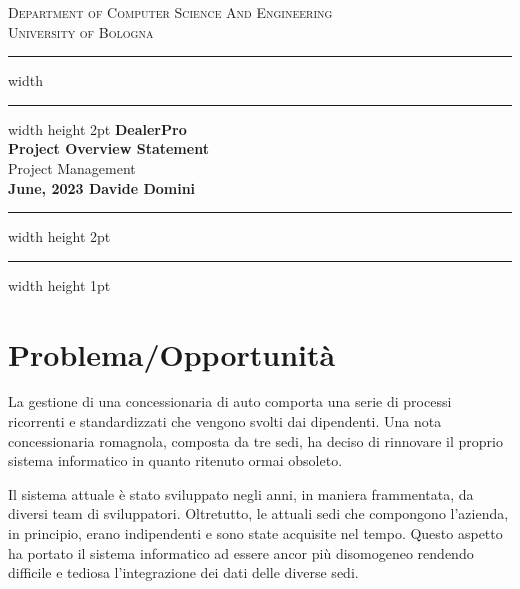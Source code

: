 \documentclass{article}
\begin{document}
\begin{titlepage}

  \newcommand{\HRule}{\rule{\linewidth}{0.5mm}}
  \center
  
  \textsc{\Large Department of Computer Science And Engineering}\\[0.5cm]
  
  \textsc{\Large University of Bologna}\\[0.6cm]
  
  \hrule width \hsize \kern 1mm \hrule width \hsize height 2pt 
  \vspace{0.8cm}
  { \large \bfseries DealerPro}\\[0.6cm]
  { \large \bfseries Project Overview Statement}\\[0.6cm]
  { \large Project Management}\\[0.6cm]
  
  
  {\bfseries{June, 2023}
  \hfill
  \bfseries{Davide Domini}}\\[0.6cm]
  
  \hrule width \hsize height 2pt \kern 1mm \hrule width \hsize height 1pt
  \vspace{0.4cm}
  
  \end{titlepage}

  \clearpage
  
  \section*{Problema/Opportunità}
  La gestione di una concessionaria di auto comporta una serie di processi ricorrenti e standardizzati che 
    vengono svolti dai dipendenti. Una nota concessionaria romagnola, composta da tre sedi, ha deciso di 
    rinnovare il proprio sistema informatico in quanto ritenuto ormai obsoleto.

  Il sistema attuale è stato sviluppato negli anni, in maniera frammentata, da diversi team di sviluppatori.
    Oltretutto, le attuali sedi che compongono l'azienda, in principio, erano indipendenti e sono state acquisite
    nel tempo. Questo aspetto ha portato il sistema informatico ad essere ancor più disomogeneo rendendo difficile 
    e tediosa l'integrazione dei dati delle diverse sedi.
\end{document}
